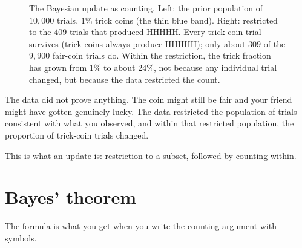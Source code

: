 \begin{figure}[h]
\centering
{}
\caption{The Bayesian update as counting. Left: the prior population of $10{,}000$ trials, $1\%$ trick coins (the thin blue band). Right: restricted to the $409$ trials that produced HHHHH. Every trick-coin trial survives (trick coins always produce HHHHH); only about $309$ of the $9{,}900$ fair-coin trials do. Within the restriction, the trick fraction has grown from $1\%$ to about $24\%$, not because any individual trial changed, but because the data restricted the count.}
\label{fig:bayes-counting}
\end{figure}

The data did not prove anything. The coin might still be fair and your friend might have gotten genuinely lucky. The data restricted the population of trials consistent with what you observed, and within that restricted population, the proportion of trick-coin trials changed.

This is what an update is: restriction to a subset, followed by counting within.

\section*{Bayes' theorem}

The formula is what you get when you write the counting argument with symbols.

